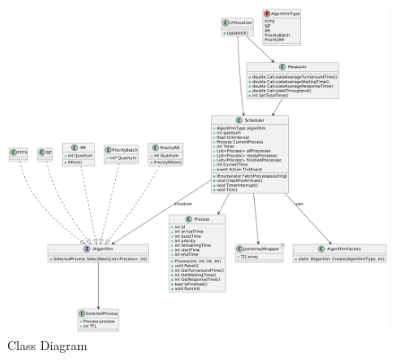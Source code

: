 \documentclass[conference]{IEEEtran}
\begin{document}
\begin{figure}[H]
    \centering
    \includegraphics[width=0.9\linewidth]{UML.png}
    \caption{Class Diagram}
    \label{fig:UML}
\end{figure}
\end{document}
